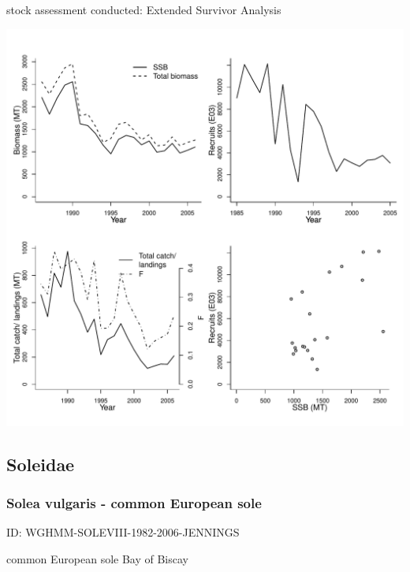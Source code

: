stock assessment conducted: Extended Survivor Analysis 
\begin{center}
\vspace{-0.2cm}\includegraphics[scale=0.65]{../tex/figures/plot-WGHMM-MEG8c9a-1985-2007-JENNINGS.pdf}
\end{center}

\newpage
\subsection{Soleidae}

\subsubsection{Solea vulgaris - common European sole}
ID: WGHMM-SOLEVIII-1982-2006-JENNINGS

common European sole Bay of Biscay 


